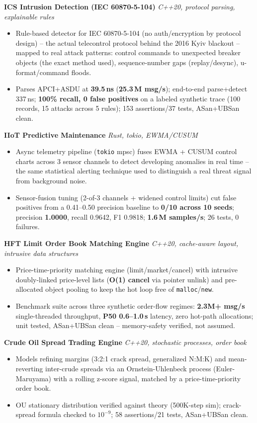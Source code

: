 \documentclass[10pt]{article}
\newcommand{\projectentry}[2]{%
  \noindent\textbf{#1} \hfill \textit{#2}\\[-0.3em]
}
\begin{document}
\projectentry{ICS Intrusion Detection (IEC 60870-5-104)}{C++20, protocol parsing, explainable rules}
\begin{itemize}
  \item Rule-based detector for IEC 60870-5-104 (no auth/encryption by protocol design) -- the actual telecontrol protocol behind the 2016 Kyiv blackout -- mapped to real attack patterns: control commands to unexpected breaker objects (the exact method used), sequence-number gaps (replay/desync), u-format/command floods.
  \item Parses APCI+ASDU at \textbf{39.5\,ns} (\textbf{25.3\,M msg/s}); end-to-end parse+detect 337\,ns; \textbf{100\% recall, 0 false positives} on a labeled synthetic trace (100 records, 15 attacks across 5 rules); 153 assertions/37 tests, ASan+UBSan clean.
\end{itemize}

\projectentry{IIoT Predictive Maintenance}{Rust, tokio, EWMA/CUSUM}
\begin{itemize}
  \item Async telemetry pipeline (\texttt{tokio} mpsc) fuses EWMA + CUSUM control charts across 3 sensor channels to detect developing anomalies in real time -- the same statistical alerting technique used to distinguish a real threat signal from background noise.
  \item Sensor-fusion tuning (2-of-3 channels + widened control limits) cut false positives from a 0.41--0.50 precision baseline to \textbf{0/10 across 10 seeds}; precision \textbf{1.0000}, recall 0.9642, F1 0.9818; \textbf{1.6\,M samples/s}; 26 tests, 0 failures.
\end{itemize}

\projectentry{HFT Limit Order Book Matching Engine}{C++20, cache-aware layout, intrusive data structures}
\begin{itemize}
  \item Price-time-priority matching engine (limit/market/cancel) with intrusive doubly-linked price-level lists (\textbf{O(1) cancel} via pointer unlink) and pre-allocated object pooling to keep the hot loop free of \texttt{malloc}/\texttt{new}.
  \item Benchmark suite across three synthetic order-flow regimes: \textbf{2.3M+ msg/s} single-threaded throughput, \textbf{P50 0.6--1.0\,\textmu s} latency, zero hot-path allocations; unit tested, ASan+UBSan clean -- memory-safety verified, not assumed.
\end{itemize}

\projectentry{Crude Oil Spread Trading Engine}{C++20, stochastic processes, order book}
\begin{itemize}
  \item Models refining margins (3:2:1 crack spread, generalized N:M:K) and mean-reverting inter-crude spreads via an Ornstein-Uhlenbeck process (Euler-Maruyama) with a rolling z-score signal, matched by a price-time-priority order book.
  \item OU stationary distribution verified against theory (500K-step sim); crack-spread formula checked to $10^{-9}$; 58 assertions/21 tests, ASan+UBSan clean.
\end{itemize}
\end{document}
